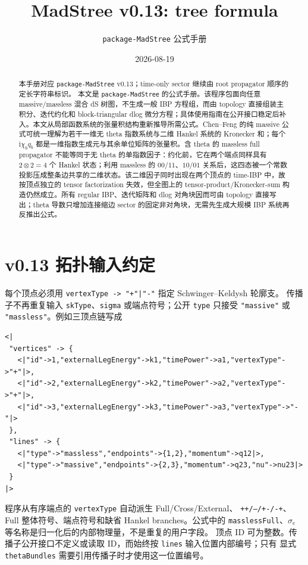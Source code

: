 \documentclass[11pt,a4paper]{ctexart}
\title{MadStree v0.13: tree formula}
\author{\texttt{package-MadStree} 公式手册}
\date{2026-08-19}
\newcommand{\ii}{\mathrm i}
\begin{document}
\maketitle

\begin{abstract}
本手册对应 \texttt{package-MadStree} v0.13；time-only sector 继续由 root propagator 顺序的定长字符串标识。
本文是 \texttt{package-MadStree} 的公式手册。该程序包面向任意 massive/massless 混合 dS 树图，不生成一般 IBP 方程组，而由 topology 直接组装主积分、迭代约化和 block-triangular dlog 微分方程；具体使用指南在公开接口稳定后补入。本文从局部函数系统的张量积结构重新推导所需公式。Chen--Feng 的纯 massive 公式可统一理解为若干一维无 theta 指数系统与二维 Hankel 系统的 Kronecker 和；每个 $\ii\chi_bq_b$ 都是一维指数生成元与其余单位矩阵的张量积。含 theta 的 massless full propagator 不能等同于无 theta 的单指数因子：约化前，它在两个端点同样具有 $2\otimes2=4$ 个 Hankel 状态；利用 massless 的 $00/11$、$10/01$ 关系后，这四态被一个常数投影压成整条边共享的二维状态。该二维因子同时出现在两个顶点的 time-IBP 中，故按顶点独立的 tensor factorization 失效，但全图上的 tensor-product/Kronecker-sum 构造仍然成立。所有 regular IBP、迭代矩阵和 dlog 对角块因而可由 topology 直接写出；theta 导数只增加连接缩边 sector 的固定非对角块，无需先生成大规模 IBP 系统再反推出公式。
\end{abstract}

\tableofcontents

\section{v0.13 拓扑输入约定}

每个顶点必须用 \texttt{vertexType -> "+"|"-"} 指定 Schwinger--Keldysh 轮廓支。
传播子不再重复输入 \texttt{skType}、\texttt{sigma} 或端点符号；公开
\texttt{type} 只接受 \texttt{"massive"} 或 \texttt{"massless"}。例如三顶点链写成
\begin{verbatim}
<|
 "vertices" -> {
   <|"id"->1,"externalLegEnergy"->k1,"timePower"->a1,"vertexType"->"+"|>,
   <|"id"->2,"externalLegEnergy"->k2,"timePower"->a2,"vertexType"->"+"|>,
   <|"id"->3,"externalLegEnergy"->k3,"timePower"->a3,"vertexType"->"-"|>
 },
 "lines" -> {
   <|"type"->"massless","endpoints"->{1,2},"momentum"->q12|>,
   <|"type"->"massive","endpoints"->{2,3},"momentum"->q23,"nu"->nu23|>
 }
|>
\end{verbatim}
程序从有序端点的 \texttt{vertexType} 自动派生 Full/Cross/External、
\texttt{++/--/+-/-+}、Full 整体符号、端点符号和缺省 Hankel branches。公式中的
\texttt{masslessFull}、$\sigma_e$ 等名称是归一化后的内部物理量，不是重复的用户字段。
顶点 ID 可为整数。传播子公开接口不定义或读取 ID，而始终按 \texttt{lines} 输入位置内部编号；只有
显式 \texttt{thetaBundles} 需要引用传播子时才使用这一位置编号。
\end{document}
